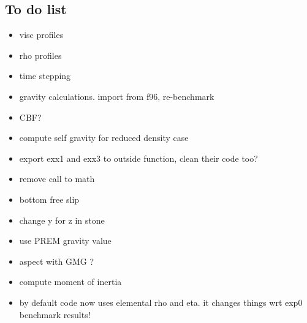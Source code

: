 \documentclass[a4paper]{article}
\begin{document}
\subsection{To do list}
\begin{itemize}
\item visc profiles
\item rho profiles
\item time stepping
\item gravity calculations. import from f96, re-benchmark
\item CBF? 
\item compute self gravity for reduced density case 
\item export exx1 and exx3 to outside function, clean their code too? 
\item remove call to math 
\item bottom free slip 
\item change y for z in stone
\item use PREM gravity value
\item aspect with GMG ?
\item compute moment of inertia
\item by default code now uses elemental rho and eta. it changes things wrt exp0 benchmark results!
\end{itemize}




 
\end{document}
